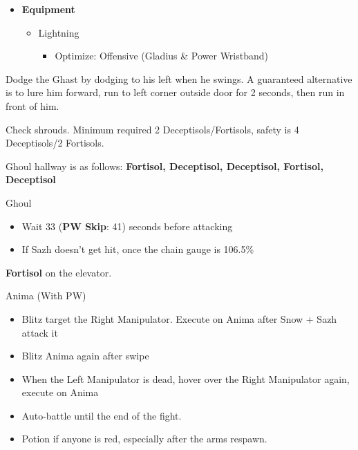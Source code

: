 \begin{multicols}{2}

\begin{menu}
\begin{itemize}
    \item \textbf{Equipment}
    \begin{itemize}
        \item Lightning
        \begin{itemize}
            \item Optimize: Offensive (Gladius \& Power Wristband)
        \end{itemize}
    \end{itemize}
\end{itemize}
\end{menu}

Dodge the Ghast by dodging to his left when he swings. A guaranteed alternative is to lure him forward, run to left corner outside door for 2 seconds, then run in front of him.

Check shrouds. Minimum required 2 Deceptisols/Fortisols, safety is 4 Deceptisols/2 Fortisols.

Ghoul hallway is as follows: {\bf Fortisol, Deceptisol, Deceptisol, Fortisol, Deceptisol}


\begin{battle}{Ghoul}
\begin{itemize}
    \item Wait 33 ({\bf PW Skip}: 41) seconds before attacking
    \item If Sazh doesn't get hit, once the chain gauge is 106.5\%
\end{itemize}
\end{battle}

\textbf{Fortisol} on the elevator.

\begin{battle}{Anima (With PW)}

\begin{itemize}
    \item Blitz target the Right Manipulator. Execute on Anima after Snow + Sazh attack it
    \item Blitz Anima again after swipe
    \item When the Left Manipulator is dead, hover over the Right Manipulator again, execute on Anima
    \item Auto-battle until the end of the fight.
    \item Potion if anyone is red, especially after the arms respawn.
\end{itemize}
\end{battle}


\end{multicols}
